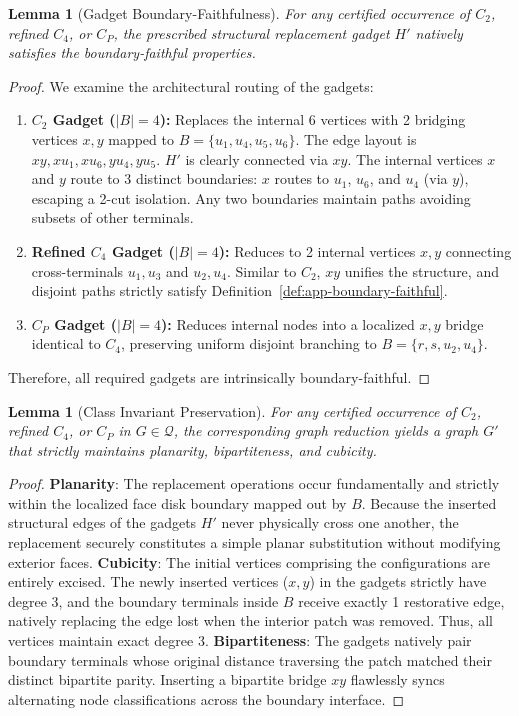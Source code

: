 \documentclass[12pt]{article}
\newtheorem{lemma}[theorem]{Lemma}
\begin{document}
\begin{lemma}[Gadget Boundary-Faithfulness]
\label{lem:app-gadget-faithful}
For any certified occurrence of $C_2$, refined $C_4$, or $C_P$, the prescribed structural replacement gadget $H'$ natively satisfies the boundary-faithful properties.
\end{lemma}
\begin{proof}
We examine the architectural routing of the gadgets:
\begin{enumerate}
    \item \textbf{$C_2$ Gadget ($|B|=4$):} Replaces the internal 6 vertices with 2 bridging vertices $x, y$ mapped to $B = \{u_1, u_4, u_5, u_6\}$. The edge layout is $xy, xu_1, xu_6, yu_4, yu_5$. $H'$ is clearly connected via $xy$. The internal vertices $x$ and $y$ route to 3 distinct boundaries: $x$ routes to $u_1$, $u_6$, and $u_4$ (via $y$), escaping a 2-cut isolation. Any two boundaries maintain paths avoiding subsets of other terminals.
    \item \textbf{Refined $C_4$ Gadget ($|B|=4$):} Reduces to 2 internal vertices $x, y$ connecting cross-terminals $u_1, u_3$ and $u_2, u_4$. Similar to $C_2$, $xy$ unifies the structure, and disjoint paths strictly satisfy Definition~\ref{def:app-boundary-faithful}.
    \item \textbf{$C_P$ Gadget ($|B|=4$):} Reduces internal nodes into a localized $x, y$ bridge identical to $C_4$, preserving uniform disjoint branching to $B=\{r, s, u_2, u_4\}$. 
\end{enumerate}
Therefore, all required gadgets are intrinsically boundary-faithful.
\end{proof}

\begin{lemma}[Class Invariant Preservation]
\label{lem:app-invariant-preservation}
For any certified occurrence of $C_2$, refined $C_4$, or $C_P$ in $G \in \mathcal{Q}$, the corresponding graph reduction yields a graph $G'$ that strictly maintains planarity, bipartiteness, and cubicity.
\end{lemma}
\begin{proof}
\textbf{Planarity}: The replacement operations occur fundamentally and strictly within the localized face disk boundary mapped out by $B$. Because the inserted structural edges of the gadgets $H'$ never physically cross one another, the replacement securely constitutes a simple planar substitution without modifying exterior faces.
\textbf{Cubicity}: The initial vertices comprising the configurations are entirely excised. The newly inserted vertices ($x, y$) in the gadgets strictly have degree 3, and the boundary terminals inside $B$ receive exactly 1 restorative edge, natively replacing the edge lost when the interior patch was removed. Thus, all vertices maintain exact degree 3.
\textbf{Bipartiteness}: The gadgets natively pair boundary terminals whose original distance traversing the patch matched their distinct bipartite parity. Inserting a bipartite bridge $xy$ flawlessly syncs alternating node classifications across the boundary interface.
\end{proof}
\end{document}
